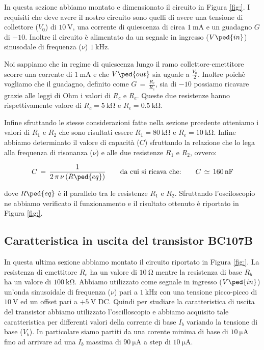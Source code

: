 In questa sezione abbiamo montato e dimensionato il circuito in Figura \ref{fig:}. I requisiti che deve avere il nostro circuito sono quelli di avere una tensione di collettore ($V_0$) di $\SI{10}{\volt}$, una corrente di quiescenza di circa $\SI{1}{\milli\ampere}$ e un guadagno $G$ di $-10$. Inoltre il circuito è alimentato da un segnale in ingresso ($V\ped{in}$) sinusodale di frequenza ($\nu$) $\SI{1}{\kilo\hertz}$.

Noi sappiamo che in regime di quiescenza lungo il ramo collettore-emettitore scorre una corrente di $\SI{1}{\milli\ampere}$ e che $V\ped{out}$ sia uguale a $\frac{V_0}{2}$. Inoltre poichè vogliamo che il guadagno, definito come $G\,=\,\frac{R_c}{R_e}$, sia di $-10$ possiamo ricavare grazie alle leggi di Ohm i valori di $R_c$ e $R_e$. Queste due resistenze hanno rispettivamente valore di $R_c=\SI{5}{\kilo\ohm}$ e $R_e=\SI{0.5}{\kilo\ohm}$.

Infine sfruttando le stesse considerazioni fatte nella sezione prcedente otteniamo i valori di $R_1$ e $R_2$ che sono risultati essere $R_1=\SI{80}{\kilo\ohm}$ e $R_e=\SI{10}{\kilo\ohm}$.
Infine abbiamo determinato il valore di capacità ($C$) sfruttando la relazione che lo lega alla frequenza di risonanza ($\nu$) e  alle due resistenze $R_1$ e $R_2$, ovvero:

\begin{equation}
	C \,=\, \frac{1}{2\,\pi\,\nu\,(R\ped{eq})} \qquad\text{da cui si ricava che:}\qquad C \,\simeq\,\SI{160}{\nano\farad}
\end{equation}

dove $R\ped{eq}$ è il parallelo tra le resistenze $R_1$ e $R_2$.
Sfruttando l'osciloscopio ne abbiamo verificato il funzionamento e il risultato ottenuto è riportato in Figura \ref{fig:}.

\subsection*{Caratteristica in uscita del transistor BC107B}

In questa ultima sezione abbiamo montato il circuito riportato in Figura \ref{fig:}. La resistenza di emettitore $R_e$ ha un valore di $\SI{10}{\ohm}$ mentre la resistenza di base $R_b$ ha un valore di $\SI{100}{\kilo\ohm}$. Abbiamo utilizzato come segnale in ingresso ($V\ped{in}$) un'onda sinusoidale di frequenza ($\nu$) pari a $\SI{1}{\kilo\hertz}$ con una tensione picco-picco di $\SI{10}{\volt}$ ed un offset pari a $+\SI{5}{\volt}$ DC.
Quindi per studiare la caratteristica di uscita del transistor abbiamo utilizzato l'oscilloscopio e abbiamo acquisito tale caratteristica per differenti valori della corrente di base $I_b$ variando la tensione di base ($V_b$). In particolare siamo partiti da una corente minima di base di $\SI{10}{\micro\ampere}$ fino ad arrivare ad una $I_b$ massima di $\SI{90}{\micro\ampere}$ a step di $\SI{10}{\micro\ampere}$.

